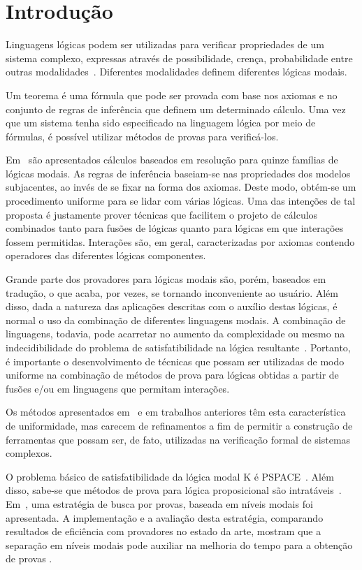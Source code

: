 \chapter{Introdução}
\label{cap:intro}

Linguagens lógicas podem ser utilizadas para verificar propriedades de um
sistema complexo, expressas através de possibilidade, crença, probabilidade
entre outras modalidades~\cite{FHMV95,rao:91c,HMM83,Hai82}. Diferentes
modalidades definem diferentes lógicas modais.

Um teorema é uma fórmula que pode ser provada com base nos axiomas e no conjunto
de regras de inferência que definem um determinado cálculo. Uma vez que um
sistema tenha sido especificado na linguagem lógica por meio de fórmulas, é
possível utilizar métodos de provas para verificá-los.

Em~\cite{nalon} são apresentados cálculos baseados em resolução para quinze
famílias de lógicas modais. As regras de inferência baseiam-se nas propriedades
dos modelos subjacentes, ao invés de se fixar na forma dos axiomas. Deste modo,
obtém-se um procedimento uniforme para se lidar com várias lógicas. Uma das
intenções de tal proposta é justamente prover técnicas que facilitem o projeto
de cálculos combinados tanto para fusões de lógicas quanto para lógicas em que
interações fossem permitidas. Interações são, em geral, caracterizadas por
axiomas contendo operadores das diferentes lógicas componentes.

Grande parte dos provadores para lógicas modais são, porém, baseados em
tradução, o que acaba, por vezes, se tornando inconveniente ao usuário. Além
disso, dada a natureza das aplicações descritas com o auxílio destas lógicas, é
normal o uso da combinação de diferentes linguagens modais. A combinação de
linguagens, todavia, pode acarretar no aumento da complexidade ou mesmo na
indecidibilidade do problema de satisfatibilidade na lógica
resultante~\cite{mdml}.
Portanto, é importante o desenvolvimento de técnicas que possam ser utilizadas
de modo uniforme na combinação de métodos de prova para lógicas obtidas a partir
de fusões e/ou em linguagens que permitam interações.

Os métodos apresentados em~\cite{nalon} e em trabalhos anteriores têm esta
característica de uniformidade, mas carecem de refinamentos a fim de permitir a
construção de ferramentas que possam ser, de fato, utilizadas na verificação
formal de sistemas complexos.

O problema básico de satisfatibilidade da lógica modal K é
PSPACE~\cite{complex_modal}. 
Além disso, sabe-se que métodos de prova para lógica proposicional são
intratáveis~\cite{complex_thproving}. Em~\cite{DBLP:conf/tableaux/NalonHD15},
uma estratégia de busca por provas, baseada em níveis modais foi apresentada. A
implementação e a avaliação desta estratégia, comparando resultados de
eficiência com provadores no estado da arte, mostram que a separação em níveis
modais pode auxiliar na melhoria do tempo para a obtenção de provas
\cite{Nalon2016}.

